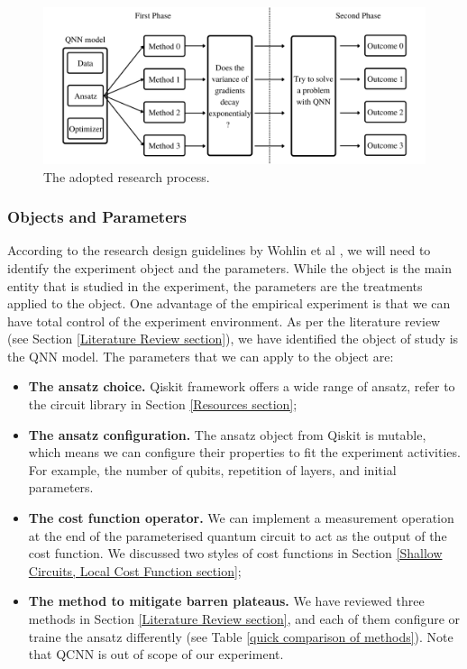 \begin{figure}
    \centering
    \includegraphics[width=\textwidth]{./ResearchDesign/Appendices/ExperimentDiagram.png}
    \caption{
        The adopted research process.
    }
    \label{Research Activities Figure}
\end{figure}

\subsubsection{Objects and Parameters}\label{Objects section}
According to the research design guidelines by Wohlin et al \cite{wohlinExperimentationSoftwareEngineering2012}, we will need to identify the experiment object and the parameters.
While the object is the main entity that is studied in the experiment, the parameters are the treatments applied to the object.
One advantage of the empirical experiment is that we can have total control of the experiment environment.
As per the literature review (see Section \ref{Literature Review section}), we have identified the object of study is the QNN model.
The parameters that we can apply to the object are:
\begin{itemize}
    \item \textbf{The ansatz choice.} Qiskit framework offers a wide range of ansatz, refer to the circuit library in Section \ref{Resources section};
    \item \textbf{The ansatz configuration.} The ansatz object from Qiskit is mutable, which means we can configure their properties to fit the experiment activities. For example, the number of qubits, repetition of layers, and initial parameters.
    \item \textbf{The cost function operator.} We can implement a measurement operation at the end of the parameterised quantum circuit to act as the output of the cost function. We discussed two styles of cost functions in Section \ref{Shallow Circuits, Local Cost Function section};
    \item \textbf{The method to mitigate barren plateaus.} We have reviewed three methods in Section \ref{Literature Review section}, and each of them configure or traine the ansatz differently (see Table \ref{quick comparison of methods}). Note that QCNN is out of scope of our experiment.
\end{itemize}

